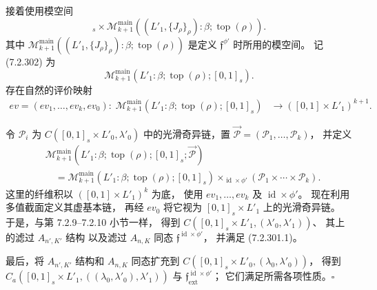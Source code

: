 接着使用模空间
\begin{equation}
[0,1]_s\times
\mathcal M_{k+1}^{\mathrm{main}}
((L'_1,\{J_\rho\}_\rho):\beta;
\operatorname{top}(\rho)).
\tag{7.2.302}\label{eq:7-2-302}
\end{equation}
其中
$\mathcal M_{k+1}^{\mathrm{main}}
((L'_1,\{J_\rho\}_\rho):\beta;
\operatorname{top}(\rho))$
是定义 $\mathfrak f^{\phi'}$ 时所用的模空间。
记 (7.2.302) 为
\[
\mathcal M_{k+1}^{\mathrm{main}}
(L'_1:\beta;\operatorname{top}(\rho);[0,1]_s).
\]
存在自然的评价映射
\[
\begin{aligned}
ev=(ev_1,\ldots,ev_k,ev_0)\colon\;
\mathcal M_{k+1}^{\mathrm{main}}
(L'_1:\beta;\operatorname{top}(\rho);[0,1]_s)
&\longrightarrow([0,1]\times L'_1)^{k+1}.
\end{aligned}
\]

令 $\mathcal P_i$ 为
$C([0,1]_s\times L'_0,\lambda'_0)$
中的光滑奇异链，置
$\vec{\mathcal P}=(\mathcal P_1,\ldots,\mathcal P_k)$，
并定义
\[
\begin{aligned}
&\mathcal M_{k+1}^{\mathrm{main}}
(L'_1:\beta;\operatorname{top}(\rho);[0,1]_s;
\vec{\mathcal P})\\
&\quad=
\mathcal M_{k+1}^{\mathrm{main}}
(L'_1:\beta;\operatorname{top}(\rho);[0,1]_s)
\times_{\operatorname{id}\times\phi'}
(\mathcal P_1\times\cdots\times\mathcal P_k).
\end{aligned}
\]
这里的纤维积以
$([0,1]\times L'_1)^k$ 为底，
使用 $ev_1,\ldots,ev_k$
及 $\operatorname{id}\times\phi'$。
现在利用多值截面定义其虚基本链，
再经 $ev_0$ 将它视为
$[0,1]_s\times L'_1$ 上的光滑奇异链。
于是，与第 7.2.9--7.2.10 小节一样，
得到 $C([0,1]_s\times L'_1,
(\lambda'_0,\lambda'_1))$、
其上的滤过 $A_{n',K'}$ 结构
以及滤过 $A_{n,K}$ 同态
$\mathfrak f^{\operatorname{id}\times\phi'}$，
并满足 (7.2.301.1)。

最后，将 $A_{n',K'}$ 结构和
$A_{n,K}$ 同态扩充到
$C([0,1]_s\times L'_0,(\lambda_0,\lambda'_0))$，
得到
$C_a([0,1]_s\times L'_1,
((\lambda_0,\lambda'_0),\lambda'_1))$
与 $\mathfrak f^{\operatorname{id}\times\phi'}_{\mathrm{ext}}$；
它们满足所需各项性质。$\square$
